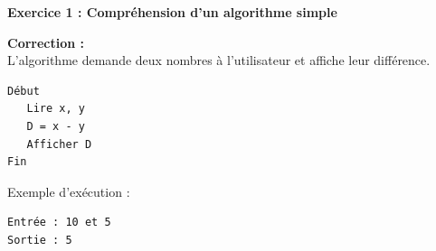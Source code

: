 \documentclass{article}
\begin{document}
\vspace{0.2cm}

\begin{tcolorbox}[colback=green!10!white, colframe=green!75!black, title=\textcolor{white}{  Corrections}]

\textbf{Exercice 1 : Compréhension d'un algorithme simple}

\textbf{Correction :} \\
L'algorithme demande deux nombres à l'utilisateur et affiche leur différence.

\begin{verbatim}
Début
   Lire x, y
   D = x - y
   Afficher D
Fin
\end{verbatim}

Exemple d'exécution :
\begin{verbatim}
Entrée : 10 et 5
Sortie : 5
\end{verbatim}

\end{tcolorbox}
\end{document}

